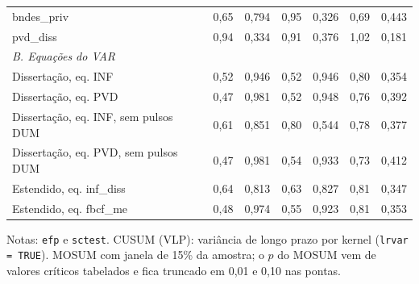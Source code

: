 \begin{table}[htbp]
\begin{tabular}{lcccccc}
bndes\_priv & 0{,}65 & 0{,}794 & 0{,}95 & 0{,}326 & 0{,}69 & 0{,}443 \\
pvd\_diss & 0{,}94 & 0{,}334 & 0{,}91 & 0{,}376 & 1{,}02 & 0{,}181 \\
\midrule
\multicolumn{7}{l}{\textit{B. Equa\c{c}\~oes do VAR}} \\
Disserta\c{c}\~ao, eq. INF & 0{,}52 & 0{,}946 & 0{,}52 & 0{,}946 & 0{,}80 & 0{,}354 \\
Disserta\c{c}\~ao, eq. PVD & 0{,}47 & 0{,}981 & 0{,}52 & 0{,}948 & 0{,}76 & 0{,}392 \\
Disserta\c{c}\~ao, eq. INF, sem pulsos DUM & 0{,}61 & 0{,}851 & 0{,}80 & 0{,}544 & 0{,}78 & 0{,}377 \\
Disserta\c{c}\~ao, eq. PVD, sem pulsos DUM & 0{,}47 & 0{,}981 & 0{,}54 & 0{,}933 & 0{,}73 & 0{,}412 \\
Estendido, eq. inf\_diss & 0{,}64 & 0{,}813 & 0{,}63 & 0{,}827 & 0{,}81 & 0{,}347 \\
Estendido, eq. fbcf\_me & 0{,}48 & 0{,}974 & 0{,}55 & 0{,}923 & 0{,}81 & 0{,}353 \\
\bottomrule
\end{tabular}
\begin{minipage}{0.97\linewidth}\footnotesize
\medskip Notas: \texttt{efp} e \texttt{sctest}. CUSUM (VLP): vari\^ancia de longo prazo por kernel (\texttt{lrvar = TRUE}). MOSUM com janela de 15\% da amostra; o $p$ do MOSUM vem de valores cr\'iticos tabelados e fica truncado em 0,01 e 0,10 nas pontas.
\end{minipage}
\end{table}

